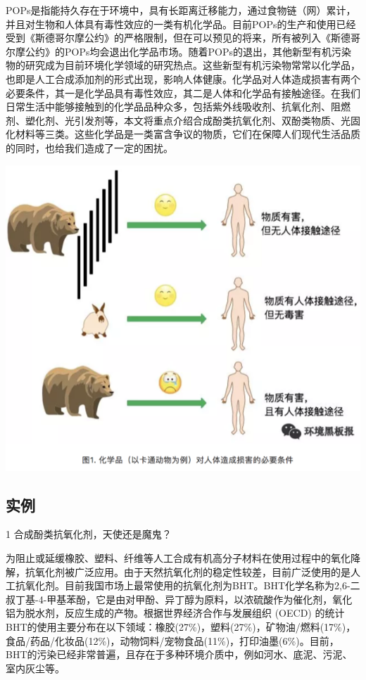 \documentclass[]{book}
\begin{document}
POPs是指能持久存在于环境中，具有长距离迁移能力，通过食物链（网）累计，并且对生物和人体具有毒性效应的一类有机化学品。目前POPs的生产和使用已经受到《斯德哥尔摩公约》的严格限制，但在可以预见的将来，所有被列入《斯德哥尔摩公约》的POPs均会退出化学品市场。随着POPs的退出，其他新型有机污染物的研究成为目前环境化学领域的研究热点。这些新型有机污染物常常以化学品，也即是人工合成添加剂的形式出现，影响人体健康。化学品对人体造成损害有两个必要条件，其一是化学品具有毒性效应，其二是人体和化学品有接触途径。在我们日常生活中能够接触到的化学品品种众多，包括紫外线吸收剂、抗氧化剂、阻燃剂、塑化剂、光引发剂等，本文将重点介绍合成酚类抗氧化剂、双酚类物质、光固化材料等三类。这些化学品是一类富含争议的物质，它们在保障人们现代生活品质的同时，也给我们造成了一定的困扰。

\includegraphics[width=8.33in]{images/epc1}

\hypertarget{ux5b9eux4f8b}{%
\subsection{实例}\label{ux5b9eux4f8b}}

1 合成酚类抗氧化剂，天使还是魔鬼？

为阻止或延缓橡胶、塑料、纤维等人工合成有机高分子材料在使用过程中的氧化降解，抗氧化剂被广泛应用。由于天然抗氧化剂的稳定性较差，目前广泛使用的是人工抗氧化剂。目前我国市场上最常使用的抗氧化剂为BHT。BHT化学名称为2,6-二叔丁基-4-甲基苯酚，它是由对甲酚、异丁醇为原料，以浓硫酸作为催化剂，氧化铝为脱水剂，反应生成的产物。根据世界经济合作与发展组织 (OECD) 的统计BHT的使用主要分布在以下领域：橡胶(27\%)，塑料(27\%)，矿物油/燃料(17\%)，食品/药品/化妆品(12\%)，动物饲料/宠物食品(11\%)，打印油墨(6\%)。目前，BHT的污染已经非常普遍，且存在于多种环境介质中，例如河水、底泥、污泥、室内灰尘等。
\end{document}
